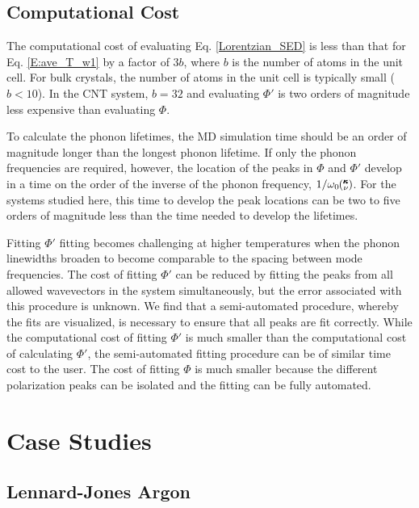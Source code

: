 \documentclass[letterpaper,12pt]{article}
\newcommand{\kv}{\mspace{-4.0mu}\left(\mspace{-8.0mu}\begin{smallmatrix}&\pmb{\kappa} \\&\nu\end{smallmatrix}\mspace{-3.0mu}\right)}
\begin{document}
\subsection{\label{Subsection_Comp_Details_3}Computational Cost}

The computational cost of evaluating Eq. \eqref{Lorentzian_SED} is less than that for Eq$.$ \eqref{E:ave_T_w1} by a factor of $3b$, where $b$ is the number of atoms in the unit cell.  For bulk crystals, the number of atoms in the unit cell is typically small ($b<10$).  In the CNT system, $b=32$ and evaluating $\Phi'$ is two orders of magnitude less expensive than evaluating $\Phi$.

To calculate the phonon lifetimes, the MD simulation time should be an order of magnitude longer than the longest phonon lifetime.\cite{thomasthesis}  If only the phonon frequencies are required, however, the location of the peaks in $\Phi$ and $\Phi'$ develop in a time on the order of the inverse of the phonon frequency, $1/\omega_0\kv$. For the systems studied here, this time to develop the peak locations can be two to five orders of magnitude less than the time needed to develop the lifetimes.

Fitting $\Phi'$ fitting becomes challenging at higher temperatures when the phonon linewidths broaden to become comparable to the spacing between mode frequencies. The cost of fitting $\Phi'$ can be reduced by fitting the peaks from all allowed wavevectors in the system simultaneously, but the error associated with this procedure is unknown.\cite{shiomi2011a} We find that a semi-automated procedure, whereby the fits are visualized, is necessary to ensure that all peaks are fit correctly.  While the computational cost of fitting $\Phi'$ is much smaller than the computational cost of calculating $\Phi'$, the semi-automated fitting procedure can be of similar time cost to the user. The cost of fitting $\Phi$ is much smaller because the different polarization peaks can be isolated and the fitting can be fully automated.

\section{\label{S:Section_Prop}Case Studies}

\subsection{\label{S:Subsection_prop_LJ}Lennard-Jones Argon}
\end{document}
